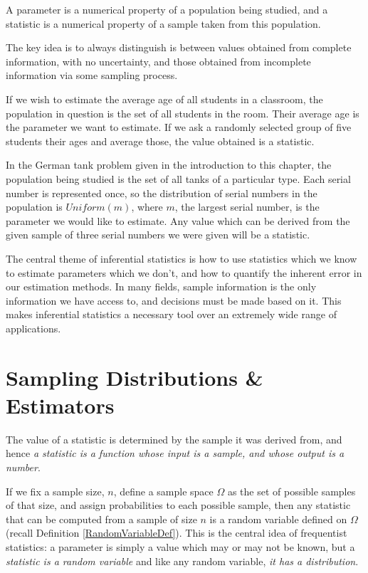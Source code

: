 \begin{definition}
A parameter is a numerical property of a population being studied, and a statistic is a numerical property of a sample taken from this population.
\end{definition}
\par
The key idea is to always distinguish is between values obtained from complete information, with no uncertainty, and those obtained from incomplete information via some sampling process.
\begin{examp}\label{ClassAge}
If we wish to estimate the average age of all students in a classroom, the population in question is the set of all students in the room. Their average age is the parameter we want to estimate. If we ask a randomly selected group of five students their ages and average those, the value obtained is a statistic.
\end{examp}
\begin{examp}
In the German tank problem given in the introduction to this chapter, the population being studied is the set of all tanks of a particular type. Each serial number is represented once, so the distribution of serial numbers in the population is $Uniform(m)$, where $m$, the largest serial number, is the parameter we would like to estimate. Any value which can be derived from the given sample of three serial numbers we were given will be a statistic.
\end{examp}
\par
The central theme of inferential statistics is how to use statistics which we know to estimate parameters which we don't, and how to quantify the inherent error in our estimation methods. In many fields, sample information is the only information we have access to, and decisions must be made based on it. This makes inferential statistics a necessary tool over an extremely wide range of applications.


\section{Sampling Distributions \& Estimators}

The value of a statistic is determined by the sample it was derived from, and hence \emph{a statistic is a function whose input is a sample, and whose output is a number}.
\par
If we fix a sample size, $n$, define a sample space $\Omega$ as the set of possible samples of that size, and assign probabilities to each possible sample, then any statistic that can be computed from a sample of size $n$ is a random variable defined on $\Omega$ (recall Definition \ref{RandomVariableDef}). This is the central idea of frequentist statistics: a parameter is simply a value which may or may not be known, but a \emph{statistic is a random variable} and like any random variable, \emph{it has a distribution}.

